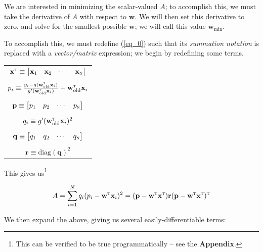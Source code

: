 \documentclass[a4paper,10pt,english]{article}
\begin{document}
\begin{multicols*}{2}
We are interested in minimizing the scalar-valued $A$; to accomplish this, we must take the derivative of $A$ with respect to $\mathbf{w}$. We will then set this derivative to zero, and solve for the smallest possible $\mathbf{w}$; we will call this value $\mathbf{w}_\text{min}$.

To accomplish this, we must redefine (\ref{eq_0}) such that its \textit{summation notation} is replaced with a \textit{vector/matrix} expression; we begin by redefining some terms.  

\begin{table}[H]
\center
\begin{tabular}{c}
$\mathbf{x}^\textsc{t} \equiv \begin{bmatrix} \mathbf{x}_1 & \mathbf{x}_2 & \cdots & \mathbf{x}_\textsc{n} \end{bmatrix}$ \\ \\
$p_i \equiv \frac{y_i - g(\mathbf{w}_\text{old}^\textsc{t} \mathbf{x}_i)}{g^\prime(\mathbf{w}_\text{old}^\textsc{t} \mathbf{x}_i)} + \mathbf{w}_\text{old}^\textsc{t} \mathbf{x}_i$ \\ \\
$\mathbf{p} \equiv \begin{bmatrix} p_1 & p_2 & \cdots & p_\textsc{n} \end{bmatrix}$ \\ \\
$q_i \equiv g^\prime(\mathbf{w}_\text{old}^\textsc{t} \mathbf{x}_i)^2$ \\ \\
$\mathbf{q} \equiv \begin{bmatrix} q_1 & q_2 & \cdots & q_\textsc{n} \end{bmatrix}$ \\ \\
$\mathbf{r} \equiv \text{diag}(\mathbf{q})^2$
\end{tabular}
\end{table}

This gives us\footnote{This can be verified to be true programmatically – see the \textbf{Appendix}.}

\begin{equation}
\label{eq_1}
A = \sum_{i=1}^{N} q_i ( p_i - \mathbf{w}^\textsc{t} \mathbf{x}_i )^2 = (\mathbf{p} - \mathbf{w}^\textsc{t} \mathbf{x}^\textsc{t}) \mathbf{r} (\mathbf{p} - \mathbf{w}^\textsc{t} \mathbf{x}^\textsc{t})^\textsc{t}
\end{equation}

We then expand the above, giving us several easily-differentiable terms:


\end{multicols*}
\end{document}
